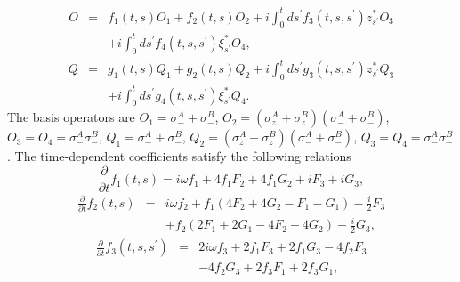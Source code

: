 \documentclass[preprint]{elsarticle}
\begin{document}
\begin{eqnarray}
O & = & f_{1}(t,s)O_{1}+f_{2}(t,s)O_{2}+i\int_{0}^{t}ds^{\prime}f_{3}(t,s,s^{\prime})z_{s^{\prime}}^{*}O_{3}\nonumber \\
 &  & +i\int_{0}^{t}ds^{\prime}f_{4}(t,s,s^{\prime})\xi_{s^{\prime}}^{*}O_{4},
\end{eqnarray}
\begin{eqnarray}
Q & = & g_{1}(t,s)Q_{1}+g_{2}(t,s)Q_{2}+i\int_{0}^{t}ds^{\prime}g_{3}(t,s,s^{\prime})z_{s^{\prime}}^{*}Q_{3}\nonumber \\
 &  & +i\int_{0}^{t}ds^{\prime}g_{4}(t,s,s^{\prime})\xi_{s^{\prime}}^{*}Q_{4}.
\end{eqnarray}
The basis operators are $O_{1}=\sigma_{-}^{A}+\sigma_{-}^{B}$, $O_{2}=(\sigma_{z}^{A}+\sigma_{z}^{B})(\sigma_{-}^{A}+\sigma_{-}^{B})$,
$O_{3}=O_{4}=\sigma_{-}^{A}\sigma_{-}^{B}$, $Q_{1}=\sigma_{-}^{A}+\sigma_{-}^{B}$,
$Q_{2}=(\sigma_{z}^{A}+\sigma_{z}^{B})(\sigma_{-}^{A}+\sigma_{-}^{B})$,
$Q_{3}=Q_{4}=\sigma_{-}^{A}\sigma_{-}^{B}$. The time-dependent coefficients
satisfy the following relations
\begin{equation}
\frac{\partial}{\partial t}f_{1}(t,s)=i\omega f_{1}+4f_{1}F_{2}+4f_{1}G_{2}+iF_{3}+iG_{3},
\end{equation}
\begin{eqnarray}
\frac{\partial}{\partial t}f_{2}(t,s) & = & i\omega f_{2}+f_{1}(4F_{2}+4G_{2}-F_{1}-G_{1})-\frac{i}{2}F_{3}\nonumber \\
 &  & +f_{2}(2F_{1}+2G_{1}-4F_{2}-4G_{2})-\frac{i}{2}G_{3},
\end{eqnarray}
\begin{eqnarray}
\frac{\partial}{\partial t}f_{3}(t,s,s^{\prime}) & = & 2i\omega f_{3}+2f_{1}F_{3}+2f_{1}G_{3}-4f_{2}F_{3}\nonumber \\
 &  & -4f_{2}G_{3}+2f_{3}F_{1}+2f_{3}G_{1},
\end{eqnarray}
\end{document}
